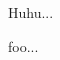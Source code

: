 \documentclass{article}
\begin{document}
Huhu...


\def\xmlfile{svgtest.xml}

\let\@@end\relax
\def\test{{}}
\test
\let\@@end\orig@end
foo...
\end{document}

